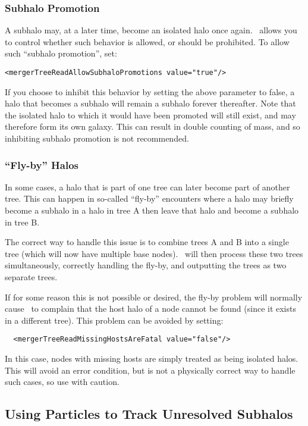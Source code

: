 \subsubsection{Subhalo Promotion}\label{sec:Tutorial:NbodyTrees:SubhaloPromotion}

A subhalo may, at a later time, become an isolated halo once again. \glc\ allows you to control whether such behavior is allowed, or should be prohibited. To allow such ``subhalo promotion'', set:
\begin{verbatim}
<mergerTreeReadAllowSubhaloPromotions value="true"/>
\end{verbatim}
If you choose to inhibit this behavior by setting the above parameter to false, a halo that becomes a subhalo will remain a subhalo forever thereafter. Note that the isolated halo to which it would have been promoted will still exist, and may therefore form its own galaxy. This can result in double counting of mass, and so inhibiting subhalo promotion is not recommended.

\subsubsection{``Fly-by'' Halos}\label{sec:Tutorial:NbodyTrees:BranchJump}

In some cases, a halo that is part of one tree can later become part of another tree. This can happen in so-called ``fly-by'' encounters where a halo may briefly become a subhalo in a halo in tree A then leave that halo and become a subhalo in tree B.

The correct way to handle this issue is to combine trees A and B into a single tree (which will now have multiple base nodes). \glc\ will then process these two trees simultaneously, correctly handling the fly-by, and outputting the trees as two separate trees.

If for some reason this is not possible or desired, the fly-by problem will normally cause \glc\ to complain that the host halo of a node cannot be found (since it exists in a different tree). This problem can be avoided by setting:
\begin{verbatim}
  <mergerTreeReadMissingHostsAreFatal value="false"/>
\end{verbatim}
In this case, nodes with missing hosts are simply treated as being isolated halos. This will avoid an error condition, but is not a physically correct way to handle such cases, so use with caution.

\subsection{Using Particles to Track Unresolved Subhalos}

